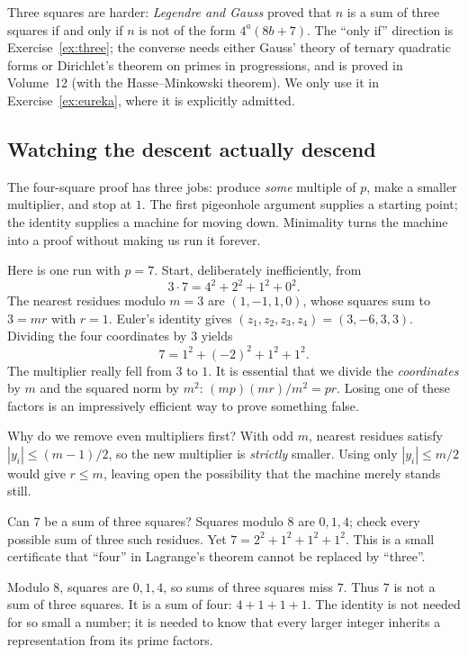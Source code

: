 \begin{remark}
Three squares are harder: \emph{Legendre and Gauss} proved that $n$ is a sum of three squares if and only if $n$ is not of the form $4^a(8b+7)$. The ``only if'' direction is Exercise~\ref{ex:three}; the converse needs either Gauss' theory of ternary quadratic forms or Dirichlet's theorem on primes in progressions, and is proved in Volume~12 (with the Hasse--Minkowski theorem). We only use it in Exercise~\ref{ex:eureka}, where it is explicitly admitted.
\end{remark}

\subsection*{Watching the descent actually descend}
The four-square proof has three jobs: produce \emph{some} multiple of $p$, make a smaller multiplier, and stop at $1$. The first pigeonhole argument supplies a starting point; the identity supplies a machine for moving down. Minimality turns the machine into a proof without making us run it forever.

Here is one run with $p=7$. Start, deliberately inefficiently, from
\[
3\cdot7=4^2+2^2+1^2+0^2.
\]
The nearest residues modulo $m=3$ are $(1,-1,1,0)$, whose squares sum to $3=mr$ with $r=1$. Euler's identity gives $(z_1,z_2,z_3,z_4)=(3,-6,3,3)$. Dividing the four coordinates by $3$ yields
\[
7=1^2+(-2)^2+1^2+1^2.
\]
The multiplier really fell from $3$ to $1$. It is essential that we divide the \emph{coordinates} by $m$ and the squared norm by $m^2$: $(mp)(mr)/m^2=pr$. Losing one of these factors is an impressively efficient way to prove something false.

Why do we remove even multipliers first? With odd $m$, nearest residues satisfy $|y_i|\le(m-1)/2$, so the new multiplier is \emph{strictly} smaller. Using only $|y_i|\le m/2$ would give $r\le m$, leaving open the possibility that the machine merely stands still.

\begin{think}
Can $7$ be a sum of three squares? Squares modulo $8$ are $0,1,4$; check every possible sum of three such residues. Yet $7=2^2+1^2+1^2+1^2$. This is a small certificate that ``four'' in Lagrange's theorem cannot be replaced by ``three''.
\end{think}

\begin{examplex}
Modulo $8$, squares are $0,1,4$, so sums of three squares miss $7$. Thus $7$ is not a sum of three squares. It is a sum of four: $4+1+1+1$. The identity is not needed for so small a number; it is needed to know that every larger integer inherits a representation from its prime factors.
\end{examplex}

